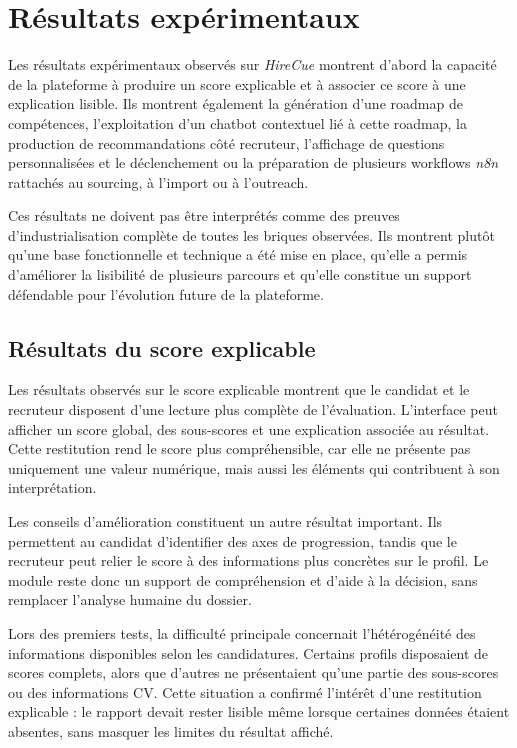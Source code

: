 \section{Résultats expérimentaux}

Les résultats expérimentaux observés sur \textit{HireCue} montrent d'abord la capacité de la plateforme à produire un score explicable et à associer ce score à une explication lisible. Ils montrent également la génération d'une roadmap de compétences, l'exploitation d'un chatbot contextuel lié à cette roadmap, la production de recommandations côté recruteur, l'affichage de questions personnalisées et le déclenchement ou la préparation de plusieurs workflows \textit{n8n} rattachés au sourcing, à l'import ou à l'outreach.

Ces résultats ne doivent pas être interprétés comme des preuves d'industrialisation complète de toutes les briques observées. Ils montrent plutôt qu'une base fonctionnelle et technique a été mise en place, qu'elle a permis d'améliorer la lisibilité de plusieurs parcours et qu'elle constitue un support défendable pour l'évolution future de la plateforme.

\subsection{Résultats du score explicable}

Les résultats observés sur le score explicable montrent que le candidat et le recruteur disposent d'une lecture plus complète de l'évaluation. L'interface peut afficher un score global, des sous-scores et une explication associée au résultat. Cette restitution rend le score plus compréhensible, car elle ne présente pas uniquement une valeur numérique, mais aussi les éléments qui contribuent à son interprétation.

Les conseils d'amélioration constituent un autre résultat important. Ils permettent au candidat d'identifier des axes de progression, tandis que le recruteur peut relier le score à des informations plus concrètes sur le profil. Le module reste donc un support de compréhension et d'aide à la décision, sans remplacer l'analyse humaine du dossier.

Lors des premiers tests, la difficulté principale concernait l'hétérogénéité des informations disponibles selon les candidatures. Certains profils disposaient de scores complets, alors que d'autres ne présentaient qu'une partie des sous-scores ou des informations CV. Cette situation a confirmé l'intérêt d'une restitution explicable : le rapport devait rester lisible même lorsque certaines données étaient absentes, sans masquer les limites du résultat affiché.


